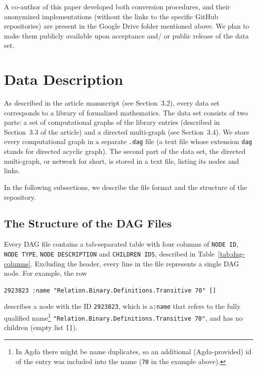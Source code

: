 \documentclass{article}
\begin{document}
A co-author of this paper developed both conversion procedures, and their anonymized implementations (without the links to the specific GitHub repositories) are present in the Google Drive folder mentioned above. We plan to make them publicly available upon acceptance and/ or public release of the data set.


\section{Data Description}
As described in the article manuscript (see Section~3.2), every data set corresponds to a library of formalized mathematics. The data set consists of two parts: a set of computational graphs of the library entries (described in Section~3.3 of the article) and a directed multi-graph (see Section~3.4). We store every computational graph in a separate \texttt{.dag} file (a text file whose extension \texttt{dag} stands for directed acyclic graph). The second part of the data set, the directed multi-graph, or network for short, is stored in a text file, listing its nodes and links.

In the following subsections, we describe the file format and the structure of the repository.

\subsection{The Structure of the DAG Files}
Every DAG file contains a tab-separated table with four columns of \texttt{NODE ID}, \texttt{NODE TYPE}, \texttt{NODE DESCRIPTION} and \texttt{CHILDREN IDS}, described in Table~\ref{tab:dag-columns}. Excluding the header, every line in the file represents a single DAG node. For example, the row 
\begin{center}
    \texttt{2923823	:name	"Relation.Binary.Definitions.Transitive 70"	[]}
\end{center}
describes a node with the ID \texttt{2923823}, which is a\texttt{:name} that refers to the fully qualified name\footnote{In Agda there might be name duplicates, so an additional (Agda-provided) id of the entry was included into the name (\texttt{70} in the example above).} \texttt{"Relation.Binary.Definitions.Transitive 70"}, and has no children (empty list \texttt{[]}).
\end{document}
